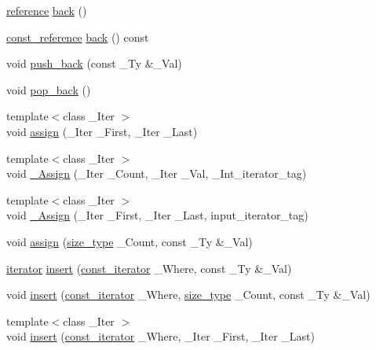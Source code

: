 \begin{DoxyCompactItemize}
\item 
\hyperlink{classvector_a68d6b0f887c9e4d0f422a1e3900b9794}{reference} \hyperlink{classvector_a98c5a0f98672a189f63e8424f9c3274e}{back} ()
\item 
\hyperlink{classvector_a22ae7381c38ba94955ba45177b24a51f}{const\+\_\+reference} \hyperlink{classvector_af7d191b66470dc5df940008dae6887dc}{back} () const 
\item 
void \hyperlink{classvector_ac2bfd37a2361f30ba58eee1eca3fc6c7}{push\+\_\+back} (const \+\_\+\+Ty \&\+\_\+\+Val)
\item 
void \hyperlink{classvector_a915399f4b25c73588948f5c363fd2111}{pop\+\_\+back} ()
\item 
{\footnotesize template$<$class \+\_\+\+Iter $>$ }\\void \hyperlink{classvector_a12288587f56ae22d9306cb39792a50c9}{assign} (\+\_\+\+Iter \+\_\+\+First, \+\_\+\+Iter \+\_\+\+Last)
\item 
{\footnotesize template$<$class \+\_\+\+Iter $>$ }\\void \hyperlink{classvector_aeba4b1947b3c0719a0d37bd8f6083fd8}{\+\_\+\+Assign} (\+\_\+\+Iter \+\_\+\+Count, \+\_\+\+Iter \+\_\+\+Val, \+\_\+\+Int\+\_\+iterator\+\_\+tag)
\item 
{\footnotesize template$<$class \+\_\+\+Iter $>$ }\\void \hyperlink{classvector_a08a08acdbaf15a5c31891aa483615fca}{\+\_\+\+Assign} (\+\_\+\+Iter \+\_\+\+First, \+\_\+\+Iter \+\_\+\+Last, input\+\_\+iterator\+\_\+tag)
\item 
void \hyperlink{classvector_a84147518414e7b1b2ca725ced50a60d4}{assign} (\hyperlink{classvector_ac975e84f5d6c2fe2267bb354a85818af}{size\+\_\+type} \+\_\+\+Count, const \+\_\+\+Ty \&\+\_\+\+Val)
\item 
\hyperlink{classvector_a5a7a542bca0f55f43e161bd5a09c483d}{iterator} \hyperlink{classvector_a26fbb403c5e2f43caea7e42c408de747}{insert} (\hyperlink{classvector_abed2910558c61a5a17113b2d250994da}{const\+\_\+iterator} \+\_\+\+Where, const \+\_\+\+Ty \&\+\_\+\+Val)
\item 
void \hyperlink{classvector_add70179791405b879492b3fbf52ef668}{insert} (\hyperlink{classvector_abed2910558c61a5a17113b2d250994da}{const\+\_\+iterator} \+\_\+\+Where, \hyperlink{classvector_ac975e84f5d6c2fe2267bb354a85818af}{size\+\_\+type} \+\_\+\+Count, const \+\_\+\+Ty \&\+\_\+\+Val)
\item 
{\footnotesize template$<$class \+\_\+\+Iter $>$ }\\void \hyperlink{classvector_a9ef38510dac40c69bb0ab0998d045f02}{insert} (\hyperlink{classvector_abed2910558c61a5a17113b2d250994da}{const\+\_\+iterator} \+\_\+\+Where, \+\_\+\+Iter \+\_\+\+First, \+\_\+\+Iter \+\_\+\+Last)

\end{DoxyCompactItemize}
